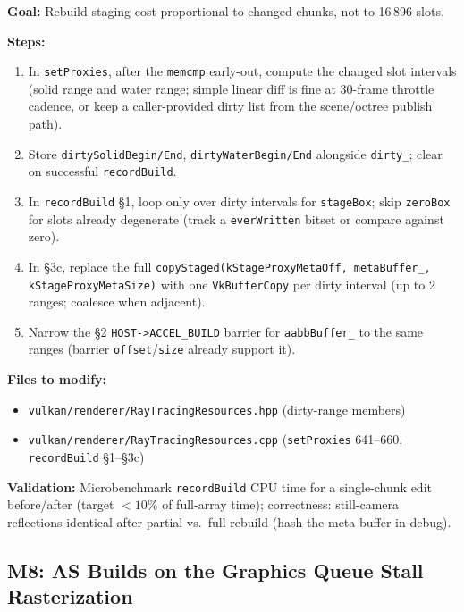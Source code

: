 \documentclass[11pt,a4paper]{article}
\begin{document}
\begin{tcolorbox}[promptbox={Prompt: Dirty-Range Proxy Staging and Partial Copies}]
\textbf{Goal:} Rebuild staging cost proportional to changed chunks, not to 16\,896 slots.

\textbf{Steps:}
\begin{enumerate}
    \item In \texttt{setProxies}, after the \texttt{memcmp} early-out, compute the changed slot intervals (solid range and water range; simple linear diff is fine at 30-frame throttle cadence, or keep a caller-provided dirty list from the scene/octree publish path).
    \item Store \texttt{dirtySolidBegin/End}, \texttt{dirtyWaterBegin/End} alongside \texttt{dirty\_}; clear on successful \texttt{recordBuild}.
    \item In \texttt{recordBuild} \S1, loop only over dirty intervals for \texttt{stageBox}; skip \texttt{zeroBox} for slots already degenerate (track a \texttt{everWritten} bitset or compare against zero).
    \item In \S3c, replace the full \texttt{copyStaged(kStageProxyMetaOff, metaBuffer\_, kStageProxyMetaSize)} with one \texttt{VkBufferCopy} per dirty interval (up to 2 ranges; coalesce when adjacent).
    \item Narrow the \S2 \texttt{HOST-\textgreater{}ACCEL\_BUILD} barrier for \texttt{aabbBuffer\_} to the same ranges (barrier \texttt{offset}/\texttt{size} already support it).
\end{enumerate}

\textbf{Files to modify:}
\begin{itemize}
    \item \texttt{vulkan/renderer/RayTracingResources.hpp} (dirty-range members)
    \item \texttt{vulkan/renderer/RayTracingResources.cpp} (\texttt{setProxies} 641--660, \texttt{recordBuild} \S1--\S3c)
\end{itemize}

\textbf{Validation:} Microbenchmark \texttt{recordBuild} CPU time for a single-chunk edit before/after (target $< 10\%$ of full-array time); correctness: still-camera reflections identical after partial vs.\ full rebuild (hash the meta buffer in debug).
\end{tcolorbox}

\subsection{M8: AS Builds on the Graphics Queue Stall Rasterization}
\end{document}

